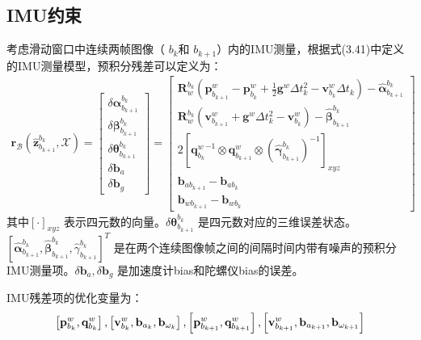 \subsection{IMU约束}
考虑滑动窗口中连续两帧图像（ $b_{k} $和 $b_{k+1} $）内的IMU测量，根据式(3.41)中定义的IMU测量模型，预积分残差可以定义为：
\begin{equation}
\label{eqn:4.9}
\begin{split}
\mathbf{r}_\mathcal{B}(\hat{\mathbf{z}}_{b_{k+1}}^{b_k},\mathcal{X})=\begin{bmatrix} \delta\bm{\alpha}_{b_{k+1}}^{b_k} \\ \delta\bm{\beta}_{b_{k+1}}^{b_k} \\ \delta\bm{\theta}_{b_{k+1}}^{b_k} \\ \delta\mathbf{b}_a \\ \delta\mathbf{b}_g  \end{bmatrix}  
=\begin{bmatrix}
\mathbf{R}_w^{b_k}(\mathbf{p}_{b_{k+1}}^w-\mathbf{p}_{b_k}^w+\frac{1}{2}\mathbf{g}^w\Delta t_k^2-\mathbf{v}_{b_k}^w\Delta t_k)-\hat{\bm{\alpha}}_{b_{k+1}}^{b_k} \\
\mathbf{R}_w^{b_k}(\mathbf{v}_{b_{k+1}}^w+\mathbf{g}^w\Delta t_k^2-\mathbf{v}_{b_k}^w)-\hat{\bm{\beta}}_{b_{k+1}}^{b_k} \\
2\left[ {\mathbf{q}_{b_k}^w}^{-1}\otimes\mathbf{q}_{b_{k+1}}^w\otimes(\hat{\bm{\gamma}}_{b_{k+1}}^{b_k})^{-1} \right]_{xyz} \\ \mathbf{b}_{ab_{k+1}}-\mathbf{b}_{ab_k} \\
\mathbf{b}_{wb_{k+1}}-\mathbf{b}_{wb_k}
\end{bmatrix}
\end{split}
\end{equation}
其中$[\cdot]_{x y z}$ 表示四元数的向量。$\delta \boldsymbol{\theta}_{b_{k+1}}^{b_{k}}$ 是四元数对应的三维误差状态。$\left[\hat{\boldsymbol{\alpha}}_{b_{k+1}}^{b_{k}}, \hat{\boldsymbol{\beta}}_{b_{k+1}}^{b_{k}}, \hat{\gamma}_{b_{k+1}}^{b_{k}}\right]^{T}$ 是在两个连续图像帧之间的间隔时间内带有噪声的预积分IMU测量项。$\delta \mathbf{b}_a, \delta \mathbf{b}_g $ 是加速度计bias和陀螺仪bias的误差。

IMU残差项的优化变量为：
\[
\setlength{\abovedisplayskip}{6pt}
\setlength{\belowdisplayskip}{6pt}
\left[ \mathbf{ p}_{b_{k}}^{w}, 
\mathbf{ q}_{b_{k}}^{w}\right],
\left[\mathbf{ v}_{b_{k}}^{w}, 
\mathbf{ b}_{a_{k}}, \mathbf{ b}_{\omega_{k}}\right], 
\left[\mathbf{ p}_{b_{k+1}}^{w}, \mathbf{q}_{b_{k+1}}^{w}\right],
\left[\mathbf{ v}_{b_{k+1}}^{w}, \mathbf{ b}_{a_{k+1}}, \mathbf{b}_{\omega_{k+1}}\right]
\]

